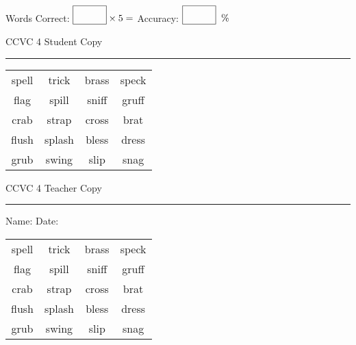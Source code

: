 \documentclass{memoir}
\begin{document}
\normalsize

Words Correct: $\fbox{\phantom{\huge 100}} \times 5 = $ Accuracy: $\fbox{\phantom{\huge 100}}\;\; \%$ 

\vfill

\newpage


\footnotesize \noindent
CCVC 4 \hfill Student Copy
\smallskip
\hrule

\Large

\setlength{\tabcolsep}{14pt}
\def\arraystretch{3}

{\selectfont


\begin{vplace}[0.5]
\begin{center}
\begin{tabular}{cccc}
spell & trick & brass       & speck \\
flag             & spill & sniff & gruff \\
crab        & strap & cross & brat               \\
flush & splash & bless & dress \\
grub & swing & slip & snag \\
\end{tabular}
\end{center}
\end{vplace}

}

\newpage

\footnotesize \noindent
CCVC 4 \hfill Teacher Copy
\smallskip
\hrule

\normalsize

\vfill

\noindent
Name: \underline{\hspace{1.75in}} \hfill Date: \underline{\hspace{1in}}

\Large

{\selectfont


\begin{vplace}[0.5]
\begin{center}
\begin{tabular}{cccc}
spell & trick & brass       & speck \\
flag             & spill & sniff & gruff \\
crab        & strap & cross & brat               \\
flush & splash & bless & dress \\
grub & swing & slip & snag \\
\end{tabular}
\end{center}
\end{vplace}



}
\end{document}
